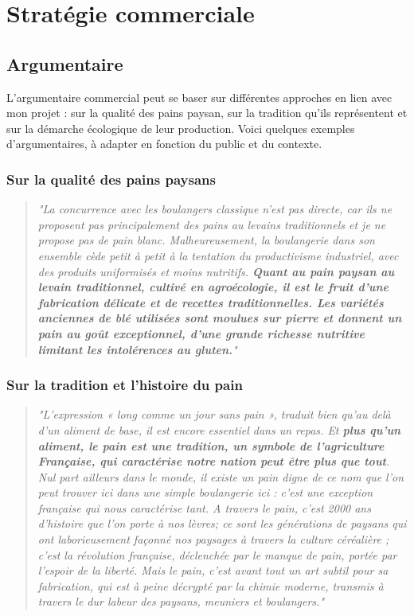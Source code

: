 \documentclass{book}
\begin{document}
\section{Stratégie commerciale}

\subsection{Argumentaire}

L'argumentaire commercial peut se baser sur différentes approches en lien avec mon projet : sur la qualité des pains paysan, sur la tradition qu'ils représentent et sur la démarche écologique de leur production. Voici quelques exemples d'argumentaires, à adapter en fonction du public et du contexte.

\subsubsection{Sur la qualité des pains paysans}

\begin{quote}

\textit{"La concurrence avec les boulangers classique n’est pas directe, car ils ne proposent pas principalement des pains au levains traditionnels et je ne propose pas de pain blanc. Malheureusement, la boulangerie dans son ensemble cède petit à petit à la tentation du productivisme industriel, avec des produits uniformisés et moins nutritifs. \textbf{Quant au pain paysan au levain traditionnel, cultivé en agroécologie, il est le fruit d'une fabrication délicate et de recettes traditionnelles. Les variétés anciennes de blé utilisées sont moulues sur pierre et donnent un pain au goût exceptionnel, d'une grande richesse nutritive limitant les intolérences au gluten.}"}

\end{quote}

\subsubsection{Sur la tradition et l'histoire du pain}

\begin{quote}
\textit{"L'expression « long comme un jour sans pain », traduit bien qu'au delà d'un aliment de base, il est encore essentiel dans un repas. Et \textbf{plus qu’un aliment, le pain est une tradition, un symbole de l’agriculture Française, qui caractérise notre nation peut être plus que tout}. Nul part ailleurs dans le monde, il existe un pain digne de ce nom que l’on peut trouver ici dans une simple boulangerie ici : c’est une exception française qui nous caractérise tant. A travers le pain, c’est 2000 ans d’histoire que l’on porte à nos lèvres; ce sont les générations de paysans qui ont laborieusement façonné nos paysages à travers la culture céréalière ; c’est la révolution française, déclenchée par le manque de pain, portée par l’espoir de la liberté. Mais le pain, c'est avant tout un art subtil pour sa fabrication, qui est à peine décrypté par la chimie moderne, transmis à travers le dur labeur des paysans, meuniers et boulangers."}
\end{quote}
\end{document}
